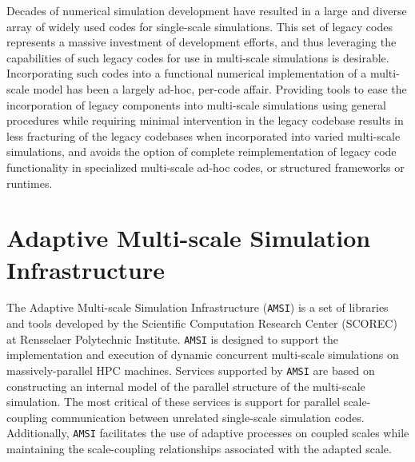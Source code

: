 \documentclass[11pt]{article}
\begin{document}
Decades of numerical simulation development have resulted in a large and diverse array of widely used codes for single-scale simulations.
This set of legacy codes represents a massive investment of development efforts, and thus leveraging the capabilities of such legacy codes for use in multi-scale simulations is desirable.
Incorporating such codes into a functional numerical implementation of a multi-scale model has been a largely ad-hoc, per-code affair.
Providing tools to ease the incorporation of legacy components into multi-scale simulations using general procedures while requiring minimal intervention in the legacy codebase results in less fracturing of the legacy codebases when incorporated into varied multi-scale simulations, and avoids the option of complete reimplementation of legacy code functionality in specialized multi-scale ad-hoc codes, or structured frameworks or runtimes.

\section{Adaptive Multi-scale Simulation Infrastructure}\label{AMSI}
The Adaptive Multi-scale Simulation Infrastructure (\verb|AMSI|) is a set of libraries and tools developed by the Scientific Computation Research Center (SCOREC) at Rensselaer Polytechnic Institute.
\verb|AMSI| is designed to support the implementation and execution of dynamic concurrent multi-scale simulations on massively-parallel HPC machines.
Services supported by \verb|AMSI| are based on constructing an internal model of the parallel structure of the multi-scale simulation.
The most critical of these services is support for parallel scale-coupling communication between unrelated single-scale simulation codes.
Additionally, \verb|AMSI| facilitates the use of adaptive processes on coupled scales while maintaining the scale-coupling relationships associated with the adapted scale.
\end{document}
